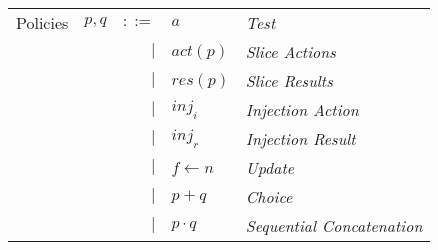 \documentclass[12pt, letterpaper]{article}
\begin{document}
    \begin{tabular}{l c r l l}
        Policies    & $p,q$ & $::=$  & $a$              & \textit{Test}     \\
                    &       & $\mid$ & $act(p)$         & \textit{Slice Actions}    \\
                    &       & $\mid$ & $res(p)$         & \textit{Slice Results}    \\
                    &       & $\mid$ & $inj_{i}$        & \textit{Injection Action} \\
                    &       & $\mid$ & $inj_{r}$        & \textit{Injection Result} \\
                    &       & $\mid$ & $f \leftarrow n$ & \textit{Update}   \\
                    &       & $\mid$ & $p + q$          & \textit{Choice}   \\
                    &       & $\mid$ & $p \cdot q$      & \textit{Sequential Concatenation}
    \end{tabular}\\


\end{document}
